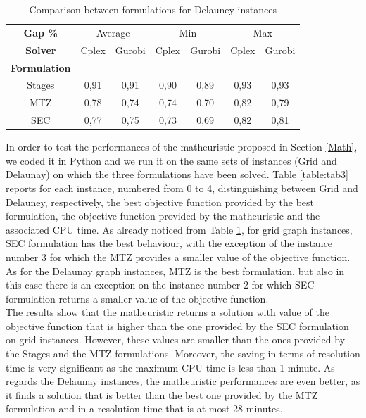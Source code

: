 \renewcommand{\arraystretch}{0.7}
\begin{table}[!h]
\caption{Comparison between formulations for Delauney instances}
\centering
\footnotesize
\begin{tabular}{c | c c | c c | c c}
\hline\hline
\textbf{Gap \%} & \multicolumn{2}{c}{Average} &  \multicolumn{2}{c}{Min} &  \multicolumn{2}{c}{Max} \\
\textbf{Solver} &Cplex &Gurobi &Cplex &Gurobi  &Cplex &Gurobi \\
\hline
\textbf{Formulation} & & & & & &\\
Stages &	0,91 &	0,91 &	0,90 &	0,89 &	0,93 &	0,93\\
MTZ	& 0,78 &	0,74 &	0,74 &	0,70 &	0,82 &	0,79\\
SEC	& 0,77 &	0,75 &	0,73 &	0,69 &	0,82 &	0,81\\
    \hline
\end{tabular}
\label{table:tab2}
\end{table}


\noindent
In order to test the performances of the matheuristic proposed in Section \ref{Math}, we coded it in Python and we run it on the same sets of instances (Grid and Delaunay) on which the three formulations have been solved. Table \ref{table:tab3} reports for each instance, numbered from 0 to 4, distinguishing between Grid and Delauney, respectively, the best objective function provided by the best formulation, the objective function provided by the matheuristic and the associated CPU time. As already noticed from Table \ref{table:tab2}, for grid graph instances, SEC formulation has the best behaviour, with the exception of the instance number 3 for which the MTZ provides a smaller value of the objective function. As for the Delaunay graph instances, MTZ is the best formulation, but also in this case there is an exception on the instance number 2 for which SEC formulation returns a smaller value of the objective function.\\
The results show that the matheuristic returns a solution with value of the objective function that is higher than the one provided by the SEC formulation on grid instances. However, these values are smaller than the ones provided by the Stages and the MTZ formulations. Moreover, the saving in terms of resolution time is very significant as the maximum CPU time is less than 1 minute.  As regards the Delaunay instances, the matheuristic performances are even better, as it finds a solution that is better than the best one provided by the MTZ formulation and in a resolution time that is at most 28 minutes. 



